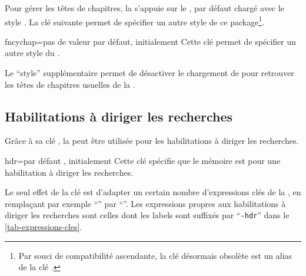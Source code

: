 Pour gérer les têtes de chapitres, la \yatCl{} s'appuie sur le
, par défaut chargé avec le style . La
clé  suivante permet de spécifier un autre style de ce
package\footnote{Par souci de compatibilité ascendante, la clé désormais
  obsolète  est un alias de la clé
  .}.%
%
{%
  \begin{docKey}{fncychap}{=\textbar{}\textbar{}\textbar{}\textbar{}\textbar{}\textbar{}\textbar{}\textbar{}}{pas
      de valeur par défaut, initialement }
    Cette clé permet de spécifier un autre style du .

    Le \enquote{style} supplémentaire  permet de désactiver le
    chargement de  pour retrouver les têtes de chapitres
    usuelles de la .
  \end{docKey}
}

\subsection{Habilitations à diriger les recherches}
\label{sec-hdr}%

Grâce à sa clé , la \yatCl{} peut être utilisée pour les
habilitations à diriger les recherches.

\begin{docKey}{hdr}{=\textbar{}}{par défaut
    , initialement }
  Cette clé spécifie que le mémoire est pour une habilitation à diriger les
  recherches.
\end{docKey}

Le seul effet de la clé  est d'adapter un certain nombre
d'expressions clés de la \yatCl{}, en remplaçant par exemple
\enquote{\foreignlanguage{french}{}} par
\enquote{\foreignlanguage{french}{}}. Les
expressions propres aux habilitations à diriger les recherches sont celles dont
les labels sont suffixés par \enquote{\texttt{-hdr}} dans le
\vref{tab-expressions-cles}.

